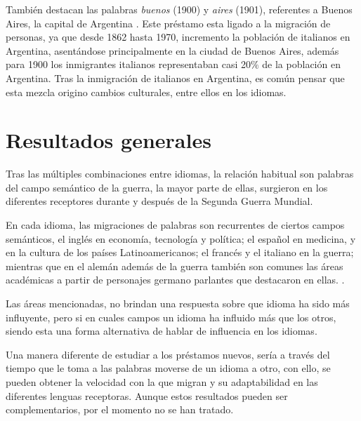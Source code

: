 También destacan las palabras  \textit{buenos} (1900) y \textit{aires} (1901), referentes a Buenos Aires, la capital de Argentina . Este préstamo esta ligado a la migración de personas,  ya que desde 1862 hasta 1970, incremento la población de italianos en Argentina,  asentándose principalmente en la ciudad de Buenos Aires,  además para 1900 los inmigrantes italianos representaban casi 20$\%$ de la población en Argentina.  Tras la inmigración de italianos en Argentina, es común pensar que esta mezcla origino cambios culturales, entre ellos en los idiomas. 







\section{Resultados generales}%



Tras las múltiples combinaciones entre idiomas, la relación habitual son palabras del campo semántico de la guerra, la mayor parte de ellas, surgieron en los diferentes receptores durante y después de la Segunda Guerra Mundial. 

En cada idioma, las migraciones de palabras son recurrentes de ciertos campos semánticos,  el inglés en economía, tecnología y política; el español en medicina, y en la cultura de los países Latinoamericanos; el francés y el italiano en la guerra; mientras que en el alemán además de la guerra también son comunes las áreas académicas  a partir de personajes germano parlantes que destacaron en ellas. .  

Las áreas mencionadas, no brindan una respuesta sobre que idioma ha sido más influyente, pero si en cuales campos un idioma ha influido más que los otros, siendo esta una forma alternativa de hablar de influencia en los idiomas.
 
Una manera diferente de estudiar a los préstamos nuevos, sería a través del tiempo que le toma a las palabras moverse de un idioma a otro, con ello, se pueden obtener la velocidad con la que migran y su adaptabilidad en las diferentes lenguas receptoras. Aunque estos resultados pueden ser complementarios, por el momento no se han tratado. 


